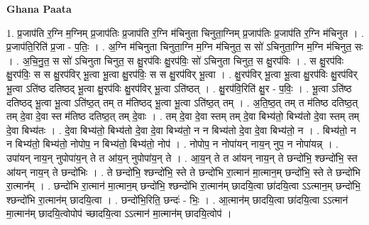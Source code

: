 \documentclass[17pt]{extarticle}
\begin{document}
\textbf{Ghana Paata } \newline

1. प्र॒जाप॑ति र॒ग्नि म॒ग्निम् प्र॒जाप॑तिः प्र॒जाप॑ति र॒ग्नि म॑चिनुता चिनुता॒ग्निम् प्र॒जाप॑तिः प्र॒जाप॑ति र॒ग्नि म॑चिनुत । . प्र॒जाप॑ति॒रिति॑ प्र॒जा - प॒तिः॒ । . अ॒ग्नि म॑चिनुता चिनुता॒ग्नि म॒ग्नि म॑चिनुत॒ स सो॑ ऽचिनुता॒ग्नि म॒ग्नि म॑चिनुत॒ सः । . अ॒चि॒नु॒त॒ स सो॑ ऽचिनुता चिनुत॒ स क्षु॒रप॑विः क्षु॒रप॑विः॒ सो॑ ऽचिनुता चिनुत॒ स क्षु॒रप॑विः । . स क्षु॒रप॑विः क्षु॒रप॑विः॒ स स क्षु॒रप॑विर् भू॒त्वा भू॒त्वा क्षु॒रप॑विः॒ स स क्षु॒रप॑विर् भू॒त्वा । . क्षु॒रप॑विर् भू॒त्वा भू॒त्वा क्षु॒रप॑विः क्षु॒रप॑विर् भू॒त्वा ऽति॑ष्ठ दतिष्ठद् भू॒त्वा क्षु॒रप॑विः क्षु॒रप॑विर् भू॒त्वा ऽति॑ष्ठत् । . क्षु॒रप॑वि॒रिति॑ क्षु॒र - प॒विः॒ । . भू॒त्वा ऽति॑ष्ठ दतिष्ठद् भू॒त्वा भू॒त्वा ऽति॑ष्ठ॒त् तम् त म॑तिष्ठद् भू॒त्वा भू॒त्वा ऽति॑ष्ठ॒त् तम् । . अ॒ति॒ष्ठ॒त् तम् त म॑तिष्ठ दतिष्ठ॒त् तम् दे॒वा दे॒वा स्त म॑तिष्ठ दतिष्ठ॒त् तम् दे॒वाः । . तम् दे॒वा दे॒वा स्तम् तम् दे॒वा बिभ्य॑तो॒ बिभ्य॑तो दे॒वा स्तम् तम् दे॒वा बिभ्य॑तः । . दे॒वा बिभ्य॑तो॒ बिभ्य॑तो दे॒वा दे॒वा बिभ्य॑तो॒ न न बिभ्य॑तो दे॒वा दे॒वा बिभ्य॑तो॒ न । . बिभ्य॑तो॒ न न बिभ्य॑तो॒ बिभ्य॑तो॒ नोपोप॒ न बिभ्य॑तो॒ बिभ्य॑तो॒ नोप॑ । . नोपोप॒ न नोपा॑यन् नाय॒न् नुप॒ न नोपा॑यन्न् । . उपा॑यन् नाय॒न् नुपोपा॑य॒न् ते त आ॑य॒न् नुपोपा॑य॒न् ते । . आ॒य॒न् ते त आ॑यन् नाय॒न् ते छन्दो॑भि॒ श्छन्दो॑भि॒ स्त आ॑यन् नाय॒न् ते छन्दो॑भिः । . ते छन्दो॑भि॒ श्छन्दो॑भि॒ स्ते ते छन्दो॑भि रा॒त्मान॑ मा॒त्मान॒म् छन्दो॑भि॒ स्ते ते छन्दो॑भि रा॒त्मान᳚म् । . छन्दो॑भि रा॒त्मान॑ मा॒त्मान॒म् छन्दो॑भि॒ श्छन्दो॑भि रा॒त्मान॑म् छादयि॒त्वा छा॑दयि॒त्वा ऽऽत्मान॒म् छन्दो॑भि॒ श्छन्दो॑भि रा॒त्मान॑म् छादयि॒त्वा । . छन्दो॑भि॒रिति॒ छन्दः॑ - भिः॒ । . आ॒त्मान॑म् छादयि॒त्वा छा॑दयि॒त्वा ऽऽत्मान॑ मा॒त्मान॑म् छादयि॒त्वोपोप॑ च्छादयि॒त्वा ऽऽत्मान॑ मा॒त्मान॑म् छादयि॒त्वोप॑ । \newline
\end{document}

